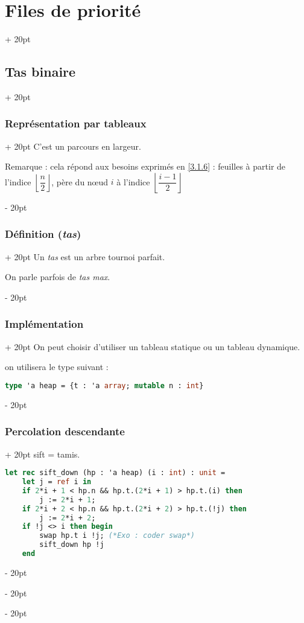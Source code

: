 \documentclass[a4paper, 12pt, twoside]{article}
\newcommand{\floor}[1]{\left\lfloor #1 \right\rfloor}
\newcommand{\ind}[1][20pt]{\advance\leftskip + #1}
\newcommand{\deind}[1][20pt]{\advance\leftskip - #1}
\newenvironment{indt}[2][20pt]{#2 \par \ind[#1]}{\par \deind} %
\begin{document}
\begin{indt}{\section{Files de priorité}}
\begin{indt}{\subsection{Tas binaire}}
\begin{indt}{\subsubsection{Représentation par tableaux}}
                C'est un parcours en largeur.
                
                \vspace{12pt}
                
                Remarque : cela répond aux besoins exprimés en \ref{3.1.6} : feuilles à partir de l'indice $\floor{\dfrac n 2}$, père du n\oe ud $i$ à l'indice $\floor{\dfrac{i - 1}{2}}$
            \end{indt}
            
            \vspace{12pt}
            
            \begin{indt}{\subsubsection{Définition (\textit{tas})}}
                Un \textit{tas} est un arbre tournoi parfait.
                
                On parle parfois de \textit{tas max}.
            \end{indt}
            
            \vspace{12pt}
            
            \begin{indt}{\subsubsection{Implémentation}}
                On peut choisir d'utiliser un tableau statique ou un tableau dynamique.
                
                on utilisera le type suivant :
                \begin{lstlisting}[language=Caml, xleftmargin=80pt]
type 'a heap = {t : 'a array; mutable n : int}\end{lstlisting}
            \end{indt}
            
            \vspace{12pt}
            
            \begin{indt}{\subsubsection{Percolation descendante}}
                sift = tamis.
                
                \begin{lstlisting}[language=Caml, xleftmargin=80pt]
let rec sift_down (hp : 'a heap) (i : int) : unit =
    let j = ref i in
    if 2*i + 1 < hp.n && hp.t.(2*i + 1) > hp.t.(i) then
        j := 2*i + 1;
    if 2*i + 2 < hp.n && hp.t.(2*i + 2) > hp.t.(!j) then
        j := 2*i + 2;
    if !j <> i then begin
        swap hp.t i !j; (*Exo : coder swap*)
        sift_down hp !j
    end\end{lstlisting}
            \end{indt}
            

\end{indt}
\end{indt}
\end{document}
